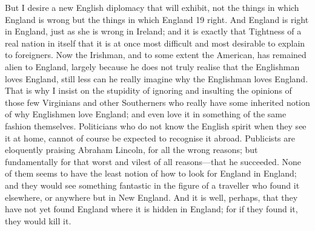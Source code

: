 \documentclass{book}
\begin{document}
But I desire a new English diplomacy that will exhibit, not the things in which England is wrong but the things in which England 19 right. And England is right in England, just as she is wrong in Ireland; and it is exactly that Tightness of a real nation in itself that it is at once most difficult and most desirable to explain to foreigners. Now the Irishman, and to some extent the American, has remained alien to England, largely because he does not truly realise that the Englishman loves England, still less can he really imagine why the Englishman loves England. That is why I insist on the stupidity of ignoring and insulting the opinions of those few Virginians and other Southerners who really have some inherited notion of why Englishmen love England; and even love it in something of the same fashion themselves. Politicians who do not know the English spirit when they see it at home, cannot of course be expected to recognise it abroad. Publicists are eloquently praising Abraham Lincoln, for all the wrong reasons; but fundamentally for that worst and vilest of all reasons—that he succeeded. None of them seems to have the least notion of how to look for England in England; and they would see something fantastic in the figure of a traveller who found it elsewhere, or anywhere but in New England. And it is well, perhaps, that they have not yet found England where it is hidden in England; for if they found it, they would kill it.
\end{document}
